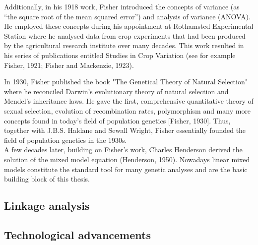 Additionally, in his 1918 work, Fisher introduced the concepts of variance (as “the square root of the mean squared error”) and analysis of variance (ANOVA). 
He employed these concepts during his appointment at Rothamsted Experimental Station where he analysed data from crop experiments that had been produced by the agricultural research institute over many decades.
This work resulted in his series of publications entitled Studies in Crop Variation (see for example Fisher, 1921; Fisher and Mackenzie, 1923). 

In 1930, Fisher published the book "The Genetical Theory of Natural Selection" where he reconciled Darwin’s evolutionary theory of natural selection and Mendel’s inheritance laws. 
He gave the first, comprehensive quantitative theory of sexual selection, evolution of recombination rates, polymorphism and many more concepts found in today’s field of population genetics [Fisher, 1930]. 
Thus, together with J.B.S. Haldane and Sewall Wright, Fisher essentially founded the field of population genetics in the 1930s.\\

A few decades later, building on Fisher’s work, Charles Henderson derived the solution of the mixed model equation (Henderson, 1950). 
Nowadays linear mixed models constitute the standard tool for many genetic analyses and are the basic building block of this thesis.

\subsection{Linkage analysis}

\subsection{Technological advancements}

